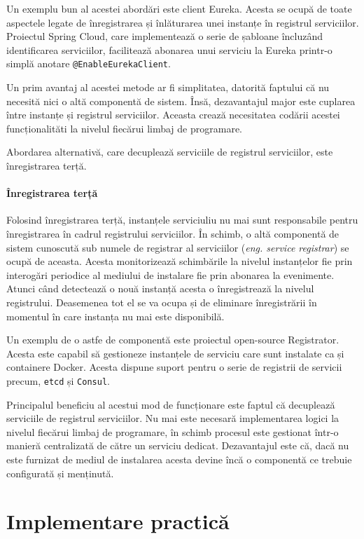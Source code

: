 \documentclass[12pt, a4paper, oneside, romanian]{teza-upb}
\begin{document}
Un exemplu bun al acestei abordări este client Eureka. Acesta se ocupă de toate aspectele legate de înregistrarea și înlăturarea unei instanțe în registrul serviciilor. Proiectul Spring Cloud, care implementează o serie de șabloane încluzând identificarea serviciilor, facilitează abonarea unui serviciu la Eureka printr-o simplă anotare \texttt{@EnableEurekaClient}.

Un prim avantaj al acestei metode ar fi simplitatea, datorită faptului că nu necesită nici o altă componentă de sistem. Însă, dezavantajul major este cuplarea între instanțe și registrul serviciilor. Aceasta crează necesitatea codării acestei funcționalităti la nivelul fiecărui limbaj de programare.

Abordarea alternativă, care decuplează serviciile de registrul serviciilor, este înregistrarea terță.
\newpage
\subsubsection{Înregistrarea terță}
Folosind înregistrarea terță, instanțele serviciuliu nu mai sunt responsabile pentru înregistrarea în cadrul registrului serviciilor. În schimb, o altă componentă de sistem cunoscută sub numele de registrar al serviciilor (\textit{eng. service registrar}) se ocupă de aceasta. 
Acesta monitorizează schimbările la nivelul instanțelor fie prin interogări periodice al mediului de instalare fie prin abonarea la evenimente. Atunci când detectează o nouă instanță acesta o înregistrează la nivelul registrului. Deasemenea tot el se va ocupa și de eliminare înregistrării în momentul în care instanța nu mai este  disponibilă. 

Un exemplu de o astfe de componentă este proiectul open-source Registrator. Acesta este capabil să gestioneze instanțele de serviciu care sunt instalate ca și containere Docker. Acesta dispune suport pentru o serie de registrii de servicii precum, \texttt{etcd} și \texttt{Consul}.

Principalul beneficiu al acestui mod de funcționare este faptul că decuplează serviciile de registrul serviciilor. Nu mai este necesară implementarea logici la nivelul fiecărui limbaj de programare, în schimb procesul este gestionat într-o manieră centralizată de către un serviciu dedicat. Dezavantajul este că, dacă nu este furnizat de mediul de instalarea acesta devine încă o componentă ce trebuie configurată și menținută.

\chapter{Implementare practică}
\end{document}
